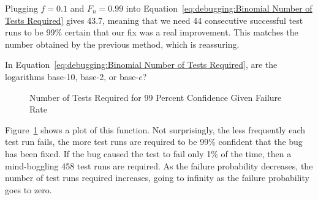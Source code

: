 Plugging $f=0.1$ and $F_n=0.99$ into
Equation~\ref{eq:debugging:Binomial Number of Tests Required}
gives 43.7, meaning that we need 44 consecutive successful test
runs to be 99\% certain that our fix was a real improvement.
This matches the number obtained by the previous method, which
is reassuring.

\QuickQuiz{}
	In Equation~\ref{eq:debugging:Binomial Number of Tests Required},
	are the logarithms base-10, base-2, or base-$e$?
 \QuickQuizEnd

\begin{figure}[tb]
\begin{center}
\end{center}
\caption{Number of Tests Required for 99 Percent Confidence Given Failure Rate}
\label{fig:debugging:Number of Tests Required for 99 Percent Confidence Given Failure Rate}
\end{figure}

Figure~\ref{fig:debugging:Number of Tests Required for 99 Percent Confidence Given Failure Rate}
shows a plot of this function.
Not surprisingly, the less frequently each test run fails, the more
test runs are required to be 99\% confident that the bug has been
fixed.
If the bug caused the test to fail only 1\% of the time, then a
mind-boggling 458 test runs are required.
As the failure probability decreases, the number of test runs required
increases, going to infinity as the failure probability goes to zero.

